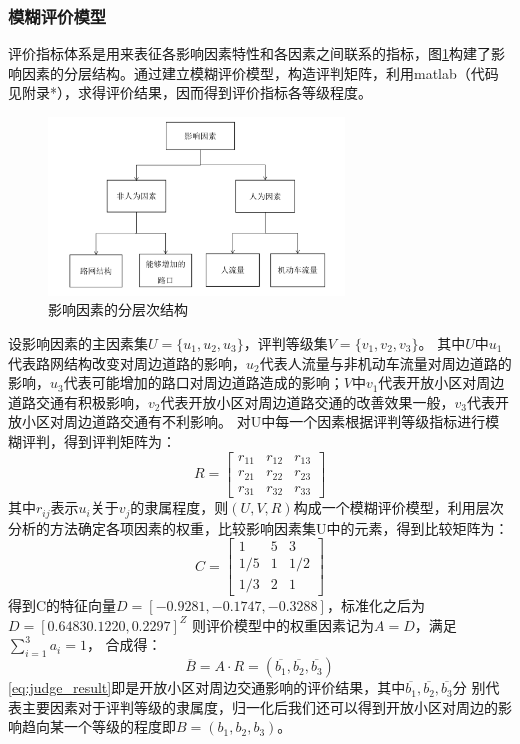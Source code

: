 \documentclass[fontset=windows,a4paper,12pt]{ctexart}
\begin{document}
		
		\subsubsection{模糊评价模型}
			评价指标体系是用来表征各影响因素特性和各因素之间联系的指标，图\ref{fig:layer_struct}构建了影响因素的分层结构。通过建立模糊评价模型，构造评判矩阵，利用matlab（代码见附录*），求得评价结果，因而得到评价指标各等级程度。
			\begin{figure}[!htbp]
				\centering
				\includegraphics[width=0.7\textwidth]{pic/judge_result.pdf}
				\caption{影响因素的分层次结构}
				\label{fig:layer_struct}
			\end{figure}
			设影响因素的主因素集$ U=\{u_1,u_2,u_3\} $，评判等级集$ V=\{v_1,v_2,v_3\} $。
			其中$ U $中$ u_1 $代表路网结构改变对周边道路的影响，$ u_2 $代表人流量与非机动车流量对周边道路的影响，$ u_3 $代表可能增加的路口对周边道路造成的影响；$ V $中$ v_1 $代表开放小区对周边道路交通有积极影响，$ v_2 $代表开放小区对周边道路交通的改善效果一般，$ v_3 $代表开放小区对周边道路交通有不利影响。
			对U中每一个因素根据评判等级指标进行模糊评判，得到评判矩阵为：
			$$
				R=\left[
				\begin{array}{cccc}
					r_{11} & r_{12} & r_{13}\\
					r_{21} & r_{22} & r_{23}\\
					r_{31} & r_{32} & r_{33}
				\end{array}
				\right]
			$$
			其中$ r_{ij} $表示$ u_i $关于$ v_j $的隶属程度，则$ (U,V,R) $构成一个模糊评价模型，利用层次分析的方法确定各项因素的权重，比较影响因素集U中的元素，得到比较矩阵为：
			$$
				C=\left[
				\begin{array}{cccc}
					1 & 5 & 3\\
					1/5 & 1 & 1/2\\
					1/3 & 2 & 1
				\end{array}
				\right]
			$$
			得到C的特征向量$ D=[-0.9281,-0.1747,-0.3288] $，标准化之后为$ D=[0.6483 0.1220,0.2297]^Z $
			则评价模型中的权重因素记为$ A=D $，满足$ \sum_{i=1}^{3}a_i=1 $，
			合成得：
			\begin{equation}
				\overline{B}=A \cdot R=(\overline{b_1},\overline{b_2},\overline{b_3}) 
				\label{eq:judge_result}
			\end{equation}
			\ref{eq:judge_result}即是开放小区对周边交通影响的评价结果，其中$\overline{b_1},\overline{b_2},\overline{b_3}$分
			别代表主要因素对于评判等级的隶属度，归一化后我们还可以得到开放小区对周边的影响趋向某一个等级的程度即$ B=(b_1,b_2,b_3) $。
\end{document}
